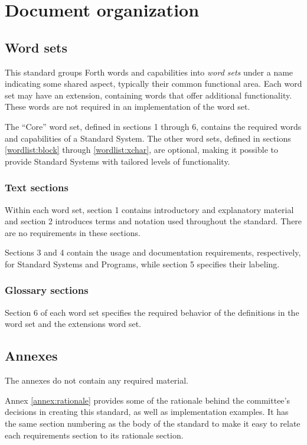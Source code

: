 \section{Document organization}
\label{intro:wordsets}

\subsection{Word sets}
This standard groups Forth words and capabilities into \emph{word sets}
under a name indicating some shared aspect, typically their common
functional area. Each word set may have an extension, containing words
that offer additional functionality. These words are not required in an
implementation of the word set.

The ``Core'' word set, defined in sections 1 through 6, contains the
required words and capabilities of a Standard System. The other word
sets, defined in sections \ref{wordlist:block} through
\ref{wordlist:xchar}, are optional, making it possible to provide
Standard Systems with tailored levels of functionality.

\subsubsection{Text sections}

Within each word set, section 1 contains introductory and explanatory
material and section 2 introduces terms and notation used throughout
the standard. There are no requirements in these sections.

Sections 3 and 4 contain the usage and documentation requirements,
respectively, for Standard Systems and Programs, while section 5
specifies their labeling.

\subsubsection{Glossary sections}

Section 6 of each word set specifies the required behavior of the
definitions in the word set and the extensions word set.

\subsection{Annexes}

The annexes do not contain any required material.

Annex \ref{annex:rationale} provides some of the rationale behind the
committee's decisions in creating this standard, as well as
implementation examples. It has the same section numbering as the
body of the standard to make it easy to relate each requirements
section to its rationale section.

